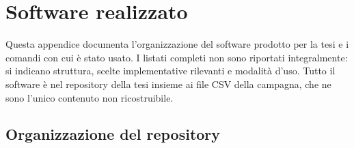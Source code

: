 \chapter{Software realizzato}
\label{app:codice}

Questa appendice documenta l'organizzazione del software prodotto per la tesi e i
comandi con cui è stato usato. I listati completi non sono riportati integralmente:
si indicano struttura, scelte implementative rilevanti e modalità d'uso. Tutto il
software è nel repository della tesi insieme ai file CSV della campagna, che ne sono
l'unico contenuto non ricostruibile.

\section{Organizzazione del repository}


